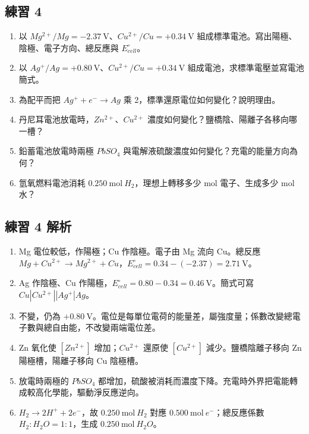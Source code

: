 \documentclass[11pt,a4paper]{article}
\providecommand{\tightlist}{%
  \setlength{\itemsep}{0pt}\setlength{\parskip}{0pt}}
\begin{document}
\subsection{練習 4}\label{ux7df4ux7fd2-4}

\begin{enumerate}
\def\labelenumi{\arabic{enumi}.}
\tightlist
\item
  以 \(Mg^{2+}/Mg=-2.37\ \mathrm V\)、\(Cu^{2+}/Cu=+0.34\ \mathrm V\) 組成標準電池。寫出陽極、陰極、電子方向、總反應與 \(E^\circ_{cell}\)。
\item
  以 \(Ag^+/Ag=+0.80\ \mathrm V\)、\(Cu^{2+}/Cu=+0.34\ \mathrm V\) 組成電池，求標準電壓並寫電池簡式。
\item
  為配平而把 \(Ag^++e^-\rightarrow Ag\) 乘 2，標準還原電位如何變化？說明理由。
\item
  丹尼耳電池放電時，\(Zn^{2+}\)、\(Cu^{2+}\) 濃度如何變化？鹽橋陰、陽離子各移向哪一槽？
\item
  鉛蓄電池放電時兩極 \(PbSO_4\) 與電解液硫酸濃度如何變化？充電的能量方向為何？
\item
  氫氧燃料電池消耗 \(0.250\ \mathrm{mol}\ H_2\)，理想上轉移多少 mol 電子、生成多少 mol 水？
\end{enumerate}

\subsection{練習 4 解析}\label{ux7df4ux7fd2-4-ux89e3ux6790}

\begin{enumerate}
\def\labelenumi{\arabic{enumi}.}
\tightlist
\item
  Mg 電位較低，作陽極；Cu 作陰極。電子由 Mg 流向 Cu。總反應 \(Mg+Cu^{2+}\rightarrow Mg^{2+}+Cu\)，\(E^\circ_{cell}=0.34-(-2.37)=2.71\ \mathrm V\)。
\item
  Ag 作陰極、Cu 作陽極，\(E^\circ_{cell}=0.80-0.34=0.46\ \mathrm V\)。簡式可寫 \(Cu|Cu^{2+}||Ag^+|Ag\)。
\item
  不變，仍為 \(+0.80\ \mathrm V\)。電位是每單位電荷的能量差，屬強度量；係數改變總電子數與總自由能，不改變兩端電位差。
\item
  Zn 氧化使 \([Zn^{2+}]\) 增加；\(Cu^{2+}\) 還原使 \([Cu^{2+}]\) 減少。鹽橋陰離子移向 Zn 陽極槽，陽離子移向 Cu 陰極槽。
\item
  放電時兩極的 \(PbSO_4\) 都增加，硫酸被消耗而濃度下降。充電時外界把電能轉成較高化學能，驅動淨反應逆向。
\item
  \(H_2\rightarrow2H^++2e^-\)，故 \(0.250\ \mathrm{mol}\ H_2\) 對應 \(0.500\ \mathrm{mol}\ e^-\)；總反應係數 \(H_2:H_2O=1:1\)，生成 \(0.250\ \mathrm{mol}\ H_2O\)。
\end{enumerate}
\end{document}
